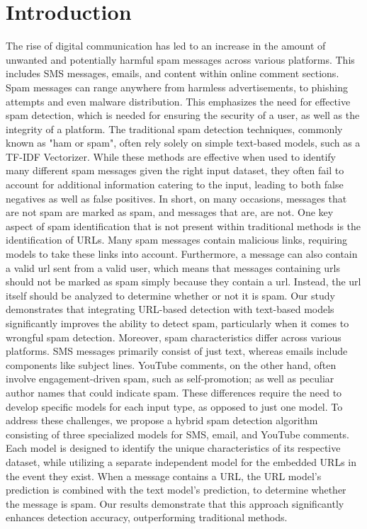 \documentclass{article}
\begin{document}
\section{Introduction}
The rise of digital communication has led to an increase in the amount of unwanted and potentially harmful spam messages across various platforms. This includes SMS messages, emails, and content within online comment sections. Spam messages can range anywhere from harmless advertisements, to phishing attempts and even malware distribution. This emphasizes the need for effective spam detection, which is needed for ensuring the security of a user, as well as the integrity of a platform. The traditional spam detection techniques, commonly known as "ham or spam", often rely solely on simple text-based models, such as a TF-IDF Vectorizer. While these methods are effective when used to identify many different spam messages given the right input dataset, they often fail to account for additional information catering to the input, leading to both false negatives as well as false positives. In short, on many occasions, messages that are not spam are marked as spam, and messages that are, are not.
\newline
\newline
One key aspect of spam identification that is not present within traditional methods is the identification of URLs. Many spam messages contain malicious links, requiring models to take these links into account. Furthermore, a message can also contain a valid url sent from a valid user, which means that messages containing urls should not be marked as spam simply because they contain a url. Instead, the url itself should be analyzed to determine whether or not it is spam. Our study demonstrates that integrating URL-based detection with text-based models significantly improves the ability to detect spam, particularly when it comes to wrongful spam detection.
\newline
\newline
Moreover, spam characteristics differ across various platforms. SMS messages primarily consist of just text, whereas emails include components like subject lines. YouTube comments, on the other hand, often involve engagement-driven spam, such as self-promotion; as well as peculiar author names that could indicate spam. These differences require the need to develop specific models for each input type, as opposed to just one model.
\newline
\newline
To address these challenges, we propose a hybrid spam detection algorithm consisting of three specialized models for SMS, email, and YouTube comments. Each model is designed to identify the unique characteristics of its respective dataset, while utilizing a separate independent model for the embedded URLs in the event they exist. When a message contains a URL, the URL model’s prediction is combined with the text model’s prediction, to determine whether the message is spam. Our results demonstrate that this approach significantly enhances detection accuracy, outperforming traditional methods.
\end{document}
